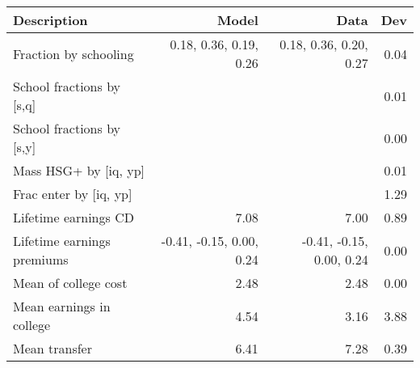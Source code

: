 \begin{tabular}{lrrr}
\hline
Description & Model  & Data  & Dev  \\ 
\hline
Fraction by schooling & 0.18, 0.36, 0.19, 0.26  & 0.18, 0.36, 0.20, 0.27  & 0.04  \\ 
School fractions by [s,q] &   &   & 0.01  \\ 
School fractions by [s,y] &   &   & 0.00  \\ 
Mass HSG+ by [iq, yp] &   &   & 0.01  \\ 
Frac enter by [iq, yp] &   &   & 1.29  \\ 
Lifetime earnings CD & 7.08  & 7.00  & 0.89  \\ 
Lifetime earnings premiums & -0.41, -0.15, 0.00, 0.24  & -0.41, -0.15, 0.00, 0.24  & 0.00  \\ 
Mean of college cost & 2.48  & 2.48  & 0.00  \\ 
Mean earnings in college & 4.54  & 3.16  & 3.88  \\ 
Mean transfer & 6.41  & 7.28  & 0.39  \\ 
\hline
\end{tabular}%
